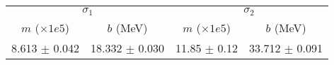 \begin{tabular}{cc|cc}
\multicolumn{2}{c|}{$\sigma_1$} & \multicolumn{2}{|c}{$\sigma_2$} \\
$m$ ($\times1e5$) & $b$ (MeV) & $m$ ($\times1e5$) & $b$ (MeV) \\
\hline
8.613 $\pm$ 0.042 & 18.332 $\pm$ 0.030 & 11.85 $\pm$ 0.12 & 33.712 $\pm$ 0.091\\
\end{tabular}
